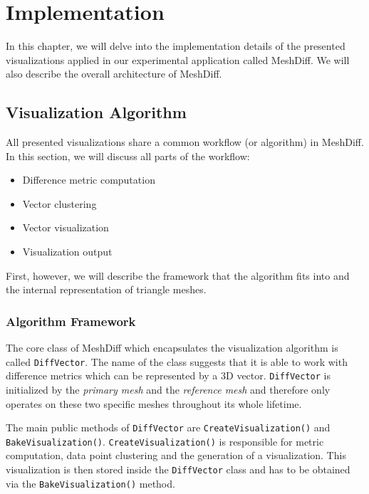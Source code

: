 \chapter{Implementation}

In this chapter, we will delve into the implementation details of the presented visualizations applied in our experimental application called MeshDiff. We will also describe the overall architecture of MeshDiff.

\section{Visualization Algorithm}
\label{sec:implementation_algorithm}

All presented visualizations share a common workflow (or algorithm) in MeshDiff. In this section, we will discuss all parts of the workflow:

\begin{itemize}
\item Difference metric computation
\item Vector clustering
\item Vector visualization
\item Visualization output
\end{itemize}

First, however, we will describe the framework that the algorithm fits into and the internal representation of triangle meshes.

\subsection{Algorithm Framework}
\label{sec:implementation-framework}

The core class of MeshDiff which encapsulates the visualization algorithm is called \verb+DiffVector+. The name of the class suggests that it is able to work with difference metrics which can be represented by a 3D vector. \verb+DiffVector+ is initialized by the {\it primary mesh} and the {\it reference mesh} and therefore only operates on these two specific meshes throughout its whole lifetime.

The main public methods of \verb+DiffVector+ are \verb+CreateVisualization()+ and \verb+BakeVisualization()+. \verb+CreateVisualization()+ is responsible for metric computation, data point clustering and the generation of a visualization. This visualization is then stored inside the \verb+DiffVector+ class and has to be obtained via the \verb+BakeVisualization()+ method.

